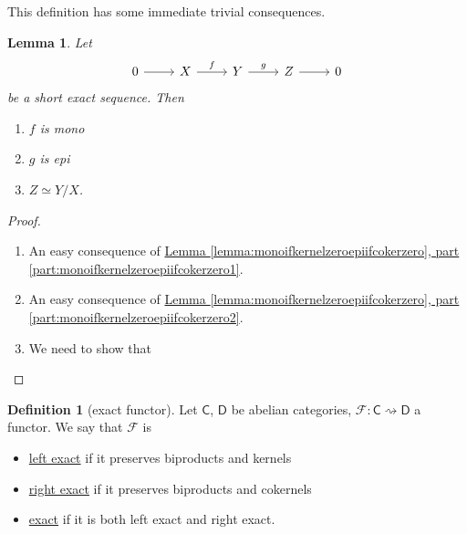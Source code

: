 \documentclass[a4paper]{report}
\newcommand{\defn}[1]{\ul{#1}}
\theoremstyle{definition}
\newtheorem{definition}{Definition}[section]
\theoremstyle{plain}
\newtheorem{lemma}{Lemma}[section]
\theoremstyle{remark}
\begin{document}
This definition has some immediate trivial consequences.
\begin{lemma}
  Let 
  \begin{equation*}
    \begin{tikzcd}
      0
      \arrow[r]
      & X
      \arrow[r, "f"]
      & Y
      \arrow[r, "g"]
      & Z
      \arrow[r]
      & 0
    \end{tikzcd}
  \end{equation*}
  be a short exact sequence. Then
  \begin{enumerate}
    \item $f$ is mono
    \item $g$ is epi
    \item $Z \simeq Y/X$.
  \end{enumerate}
\end{lemma}
\begin{proof}
  $\,$
  \begin{enumerate}
    \item An easy consequence of \hyperref[lemma:monoifkernelzeroepiifcokerzero]{Lemma \ref*{lemma:monoifkernelzeroepiifcokerzero}, part \ref*{part:monoifkernelzeroepiifcokerzero1}}.
    \item An easy consequence of \hyperref[lemma:monoifkernelzeroepiifcokerzero]{Lemma \ref*{lemma:monoifkernelzeroepiifcokerzero}, part \ref*{part:monoifkernelzeroepiifcokerzero2}}.
    \item We need to show that
  \end{enumerate}
\end{proof}

\begin{definition}[exact functor]
  \label{def:exactfunctor}
  Let $\mathsf{C}$, $\mathsf{D}$ be abelian categories, $\mathcal{F}\colon \mathsf{C} \rightsquigarrow \mathsf{D}$ a functor. We say that $\mathcal{F}$ is
  \begin{itemize}
    \item \defn{left exact} if it preserves biproducts and kernels
    \item \defn{right exact} if it preserves biproducts and cokernels
    \item \defn{exact} if it is both left exact and right exact.
  \end{itemize}
\end{definition}
\end{document}
